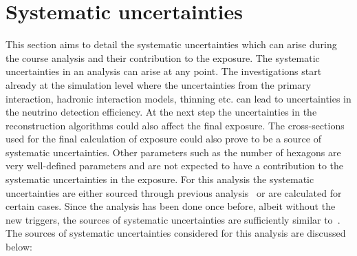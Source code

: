 \section{Systematic uncertainties}
\label{sec:det_uncert}
This section aims to detail the systematic uncertainties which can arise during the course analysis and their contribution to the exposure. The systematic uncertainties in an analysis can arise at any point. The investigations start already at the simulation level where the uncertainties from the primary interaction, hadronic interaction models, thinning etc. can lead to uncertainties in the neutrino detection efficiency. At the next step the uncertainties in the reconstruction algorithms could also affect the final exposure. The cross-sections used for the final calculation of exposure could also prove to be a source of systematic uncertainties. Other parameters such as the number of hexagons are very well-defined parameters and are not expected to have a contribution to the systematic uncertainties in the exposure. For this analysis the systematic uncertainties are either sourced through previous analysis~\cite{gap_systematics} or are calculated for certain cases. Since the analysis has been done once before, albeit without the new triggers, the sources of systematic uncertainties are sufficiently similar to~\cite{gap_note_2013}. 
The sources of systematic uncertainties considered for this analysis are discussed below:
